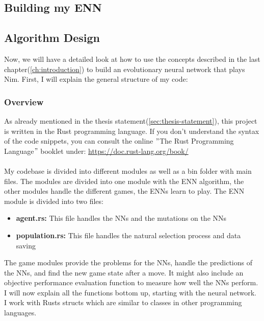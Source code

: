 \documentclass[11pt]{report}
\begin{document}
\begin{enumerate}
    \chapter{Building my ENN}\label{ch:building-my-enn}

    \section{Algorithm Design}\label{sec:algorithm-design}
    Now, we will have a detailed look at how to use the concepts described in the last chapter(\ref{ch:introduction}) to build an evolutionary neural network that plays Nim.
    First, I will explain the general structure of my code:
        \subsection{Overview}\label{subsec:overview}
    As already mentioned in the thesis statement(\ref{sec:thesis-statement}), this project is written in the Rust programming language.
    If you don't understand the syntax of the code snippets, you can consult the online \("\)The Rust Programming Language\("\) booklet under: \url{https://doc.rust-lang.org/book/}
    \\ \\
    My codebase is divided into different modules as well as a bin folder with main files.
    The modules are divided into one module with the ENN algorithm, the other modules handle the different games, the ENNs learn to play.
    The ENN module is divided into two files:
    \begin{itemize}
        \item \textbf{agent.rs:} This file handles the NNs and the mutations on the NNs
        \item \textbf{population.rs:} This file handles the natural selection process and data saving
    \end{itemize}
    The game modules provide the problems for the NNs, handle the predictions of the NNs, and find the new game state after a move.
    It might also include an objective performance evaluation function to measure how well the NNs perform.
    I will now explain all the functions bottom up, starting with the neural network.
    I work with Rusts structs which are similar to classes in other programming languages.

\end{enumerate}
\end{document}
